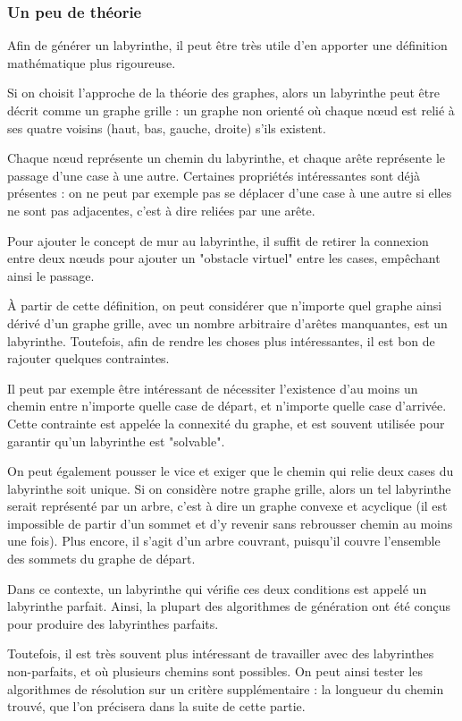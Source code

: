\documentclass[12pt]{scrreprt} %
\begin{document}
\subsubsection{Un peu de théorie}

Afin de générer un labyrinthe, il peut être très utile d'en apporter une définition mathématique plus rigoureuse.

Si on choisit l'approche de la théorie des graphes, alors un labyrinthe peut être décrit comme un graphe grille : un graphe non orienté où chaque nœud est relié à ses quatre voisins (haut, bas, gauche, droite) s'ils existent.

Chaque nœud représente un chemin du labyrinthe, et chaque arête représente le passage d'une case à une autre. Certaines propriétés intéressantes sont déjà présentes : on ne peut par exemple pas se déplacer d'une case à une autre si elles ne sont pas adjacentes, c'est à dire reliées par une arête.

Pour ajouter le concept de mur au labyrinthe, il suffit de retirer la connexion entre deux nœuds pour ajouter un "obstacle virtuel" entre les cases, empêchant ainsi le passage.

À partir de cette définition, on peut considérer que n'importe quel graphe ainsi dérivé d'un graphe grille, avec un nombre arbitraire d'arêtes manquantes, est un labyrinthe. Toutefois, afin de rendre les choses plus intéressantes, il est bon de rajouter quelques contraintes.

Il peut par exemple être intéressant de nécessiter l'existence d'au moins un chemin entre n'importe quelle case de départ, et n'importe quelle case d'arrivée. Cette contrainte est appelée la connexité du graphe, et est souvent utilisée pour garantir qu'un labyrinthe est "solvable".

On peut également pousser le vice et exiger que le chemin qui relie deux cases du labyrinthe soit unique. Si on considère notre graphe grille, alors un tel labyrinthe serait représenté par un arbre, c'est à dire un graphe convexe et acyclique (il est impossible de partir d'un sommet et d'y revenir sans rebrousser chemin au moins une fois). Plus encore, il s'agit d'un arbre couvrant, puisqu'il couvre l'ensemble des sommets du graphe de départ.

Dans ce contexte, un labyrinthe qui vérifie ces deux conditions est appelé un labyrinthe parfait. Ainsi, la plupart des algorithmes de génération ont été conçus pour produire des labyrinthes parfaits.

Toutefois, il est très souvent plus intéressant de travailler avec des labyrinthes non-parfaits, et où plusieurs chemins sont possibles. On peut ainsi tester les algorithmes de résolution sur un critère supplémentaire : la longueur du chemin trouvé, que l'on précisera dans la suite de cette partie.
\end{document}
